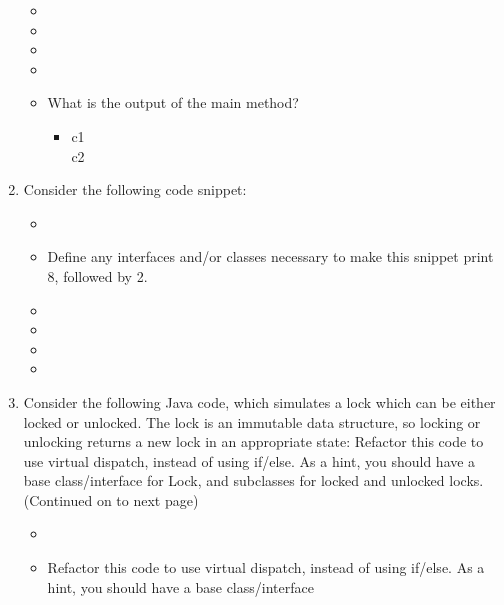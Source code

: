 \documentclass[12pt,a4paper]{article}
\begin{document}
\begin{enumerate}
\begin{itemize}
      \item[] 
      \item[] 
      \item[] 
      \item[]  
      \item[] What is the output of the main method? 
      \begin{itemize}
        \item[] c1\\c2
      \end{itemize} 
    \end{itemize}
    \clearpage
    \item Consider the following code snippet: %
    \begin{itemize}
      \item[] 
      \item[] Define any interfaces and/or classes necessary to make this snippet print 8, followed by 2.
      \item[] 
      \item[] 
      \item[] 
      \item[]   
    \end{itemize}
    \clearpage
    \item Consider the following Java code, which simulates a lock which can be either locked or unlocked. The lock is an immutable 
    data structure, so locking or unlocking returns a new lock in an appropriate state: Refactor this code to use virtual dispatch, 
    instead of using if/else. As a hint, you should have a base class/interface for Lock, and subclasses for locked and unlocked locks. 
    (Continued on to next page) %
    \begin{itemize}
      \item[] 
      \item[] Refactor this code to use virtual dispatch, instead of using if/else. As a hint, you should have a base class/interface 

\end{itemize}
\end{enumerate}
\end{document}
